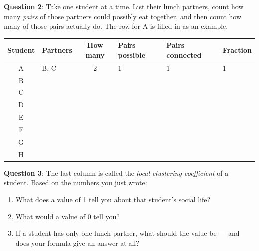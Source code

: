 \documentclass[a4paper, 14pt]{extarticle}
\begin{document}
\begin{minipage}{\textwidth}
{\bf Question 2}:
Take one student at a time. List their lunch partners, count how many
\emph{pairs} of those partners could possibly eat together, and then count how
many of those pairs actually do. The row for A is filled in as an example.

\begin{center}
{\small
\begin{tabular}{|c|p{2.6cm}|c|p{2.2cm}|p{2.4cm}|p{1.8cm}|}
\hline
Student & Partners & How many & Pairs possible & Pairs connected & Fraction \\
\hline
A & B, C & 2 & 1 & 1 & 1 \\[0.35cm]
\hline
B & & & & & \\[0.45cm]
\hline
C & & & & & \\[0.45cm]
\hline
D & & & & & \\[0.45cm]
\hline
E & & & & & \\[0.45cm]
\hline
F & & & & & \\[0.45cm]
\hline
G & & & & & \\[0.45cm]
\hline
H & & & & & \\[0.45cm]
\hline
\end{tabular}
}
\end{center}
\end{minipage}

\clearpage

{\bf Question 3}:
The last column is called the \emph{local clustering coefficient} of a student.
Based on the numbers you just wrote:

\begin{enumerate}
    \item What does a value of 1 tell you about that student's social life?

    \underline{\hspace{\textwidth}}

    \item What would a value of 0 tell you?

    \underline{\hspace{\textwidth}}

    \item If a student has only one lunch partner, what should the value be ---
          and does your formula give an answer at all?

    \underline{\hspace{\textwidth}}
\end{enumerate}
\end{document}
